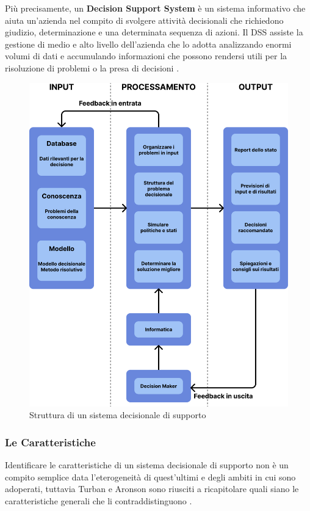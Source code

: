 Più precisamente, un \textbf{Decision Support System} è un sistema informativo che aiuta un'azienda nel compito di svolgere attività decisionali che richiedono giudizio, determinazione e una determinata sequenza di azioni. Il DSS assiste la gestione di medio e alto livello dell'azienda che lo adotta analizzando enormi volumi di dati e accumulando informazioni che possono rendersi utili per la risoluzione di problemi o la presa di decisioni \cite{cfi_dss}.

\begin{figure} [H]
    \centering
    \includegraphics[height=1\linewidth]{figure/capitolo_2/Decision Support System Structure.pdf}
    \caption{Struttura di un sistema decisionale di supporto}
    \label{fig:Decision Support System Structure}
\end{figure}

\subsubsection{Le Caratteristiche}

Identificare le caratteristiche di un sistema decisionale di supporto non è un compito semplice data l'eterogeneità di quest'ultimi e degli ambiti in cui sono adoperati, tuttavia Turban e Aronson sono riusciti a ricapitolare quali siano le caratteristiche generali che li contraddistinguono \cite{dss_characteristics}.

